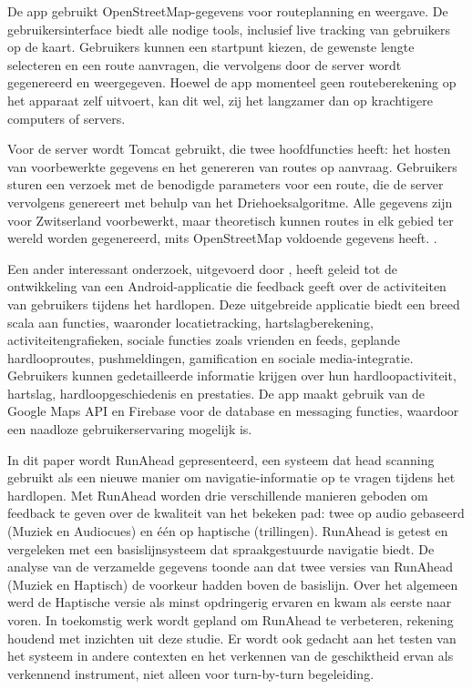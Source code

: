  
    De app gebruikt OpenStreetMap-gegevens voor routeplanning en weergave. 
    De gebruikersinterface biedt alle nodige tools, inclusief live tracking van gebruikers op de kaart. 
    Gebruikers kunnen een startpunt kiezen, de gewenste lengte selecteren en een route aanvragen, 
    die vervolgens door de server wordt gegenereerd en weergegeven. Hoewel de app momenteel geen routeberekening op het apparaat zelf uitvoert, 
    kan dit wel, zij het langzamer dan op krachtigere computers of servers.

    
    Voor de server wordt Tomcat gebruikt, die twee hoofdfuncties heeft: 
    het hosten van voorbewerkte gegevens en het genereren van routes op aanvraag. 
    Gebruikers sturen een verzoek met de benodigde parameters voor een route, 
    die de server vervolgens genereert met behulp van het Driehoeksalgoritme. 
    Alle gegevens zijn voor Zwitserland voorbewerkt, maar theoretisch kunnen routes in elk gebied ter wereld worden gegenereerd, 
    mits OpenStreetMap voldoende gegevens heeft.
    \autocite{Schulze2016}.

    \hspace{2cm}

    Een ander interessant onderzoek, uitgevoerd door \textcite{Adwinda2020}, 
    heeft geleid tot de ontwikkeling van een Android-applicatie die feedback geeft over de activiteiten van gebruikers tijdens het hardlopen. 
    Deze uitgebreide applicatie biedt een breed scala aan functies, waaronder locatietracking, hartslagberekening, activiteitengrafieken, sociale functies zoals vrienden en feeds, 
    geplande hardlooproutes, pushmeldingen, gamification en sociale media-integratie. Gebruikers kunnen gedetailleerde informatie krijgen over hun hardloopactiviteit, hartslag, 
    hardloopgeschiedenis en prestaties. De app maakt gebruik van de Google Maps API en Firebase voor de database en messaging functies, waardoor een naadloze gebruikerservaring mogelijk is.

    \hspace{2cm}

    \textcite{Gallo2020} 
    In dit paper wordt RunAhead gepresenteerd, 
    een systeem dat head scanning gebruikt als een nieuwe manier om navigatie-informatie op te vragen tijdens het hardlopen. 
    Met RunAhead worden drie verschillende manieren geboden om feedback te geven over de kwaliteit van het bekeken pad: 
    twee op audio gebaseerd (Muziek en Audiocues) en één op haptische (trillingen). 
    RunAhead is getest en vergeleken met een basislijnsysteem dat spraakgestuurde navigatie biedt. 
    De analyse van de verzamelde gegevens toonde aan dat twee versies van RunAhead (Muziek en Haptisch) de voorkeur hadden boven de basislijn. 
    Over het algemeen werd de Haptische versie als minst opdringerig ervaren en kwam als eerste naar voren. 
    In toekomstig werk wordt gepland om RunAhead te verbeteren, rekening houdend met inzichten uit deze studie. 
    Er wordt ook gedacht aan het testen van het systeem in andere contexten en het verkennen van de geschiktheid ervan als verkennend instrument, 
    niet alleen voor turn-by-turn begeleiding.

